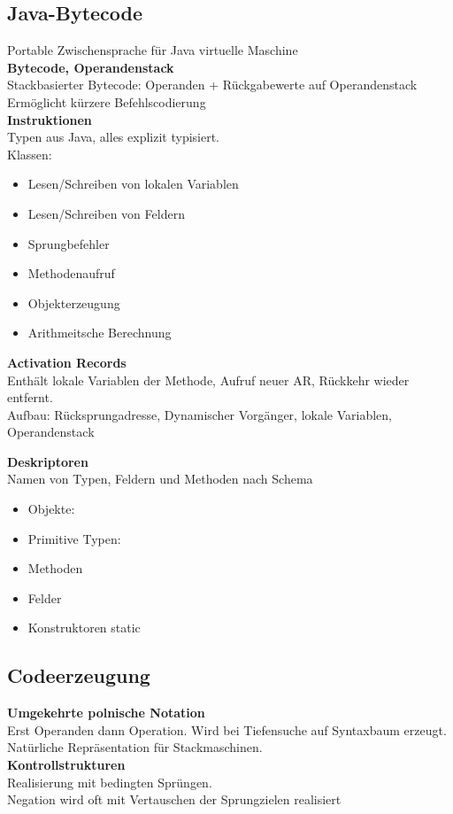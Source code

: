 \subsection{Java-Bytecode}
Portable Zwischensprache für Java virtuelle Maschine\\

\textbf{Bytecode, Operandenstack}\\
Stackbasierter Bytecode: Operanden + Rückgabewerte auf Operandenstack\\
Ermöglicht kürzere Befehlscodierung\\

\textbf{Instruktionen}\\
Typen aus Java, alles explizit typisiert.\\
Klassen:
\begin{itemize}
\item Lesen/Schreiben von lokalen Variablen
\item Lesen/Schreiben von Feldern
\item Sprungbefehler
\item Methodenaufruf
\item Objekterzeugung
\item Arithmeitsche Berechnung
\end{itemize}

\textbf{Activation Records}\\
Enthält lokale Variablen der Methode, Aufruf neuer AR, Rückkehr wieder entfernt.\\
Aufbau: Rücksprungadresse, Dynamischer Vorgänger, lokale Variablen, Operandenstack

\textbf{Deskriptoren}\\
Namen von Typen, Feldern und Methoden nach Schema
\begin{itemize}
\item Objekte: 
\item Primitive Typen: 
\item Methoden 
\item Felder 
\item Konstruktoren  static 
\end{itemize}


\subsection{Codeerzeugung}
\textbf{Umgekehrte polnische Notation}\\
Erst Operanden dann Operation. Wird bei Tiefensuche auf Syntaxbaum erzeugt.
Natürliche Repräsentation für Stackmaschinen.\\

\textbf{Kontrollstrukturen}\\
Realisierung mit bedingten Sprüngen.\\
Negation wird oft mit Vertauschen der Sprungzielen realisiert
